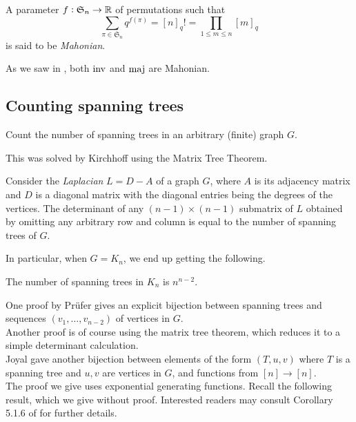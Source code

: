 	\begin{definition}
		A parameter $f : \mathfrak{S}_n \to \mathbb{R}$ of permutations such that
		\[ \sum_{\pi \in \mathfrak{S}_n} q^{f(\pi)} = [n]_q! = \prod_{1 \le m \le n} [m]_q \]
		is said to be \emph{Mahonian}.
	\end{definition}

	As we saw in , both $\operatorname{inv}$ and $\operatorname{maj}$ are Mahonian.

\subsection{Counting spanning trees}

	\begin{problem*}
		Count the number of spanning trees in an arbitrary (finite) graph $G$.
	\end{problem*}

	This was solved by Kirchhoff using the Matrix Tree Theorem.
	
	\begin{ftheo}
		Consider the \emph{Laplacian} $L = D-A$ of a graph $G$, where $A$ is its adjacency matrix and $D$ is a diagonal matrix with the diagonal entries being the degrees of the vertices. The determinant of any $(n-1)\times(n-1)$ submatrix of $L$ obtained by omitting any arbitrary row and column is equal to the number of spanning trees of $G$.
	\end{ftheo}


	In particular, when $G = K_n$, we end up getting the following.

	\begin{ftheo}
		\label{theo: cayleys theorem}
		The number of spanning trees in $K_n$ is $n^{n-2}$.
	\end{ftheo}
	One proof by Pr\"{u}fer gives an explicit bijection between spanning trees and sequences $(v_1,\ldots,v_{n-2})$ of vertices in $G$.\\
	Another proof is of course using the matrix tree theorem, which reduces it to a simple determinant calculation.\\
	Joyal gave another bijection between elements of the form $(T,u,v)$ where $T$ is a spanning tree and $u,v$ are vertices in $G$, and functions from $[n] \to [n]$.\\

	The proof we give uses exponential generating functions. Recall the following result, which we give without proof. Interested readers may consult Corollary 5.1.6 of \cite{ec2} for further details.

